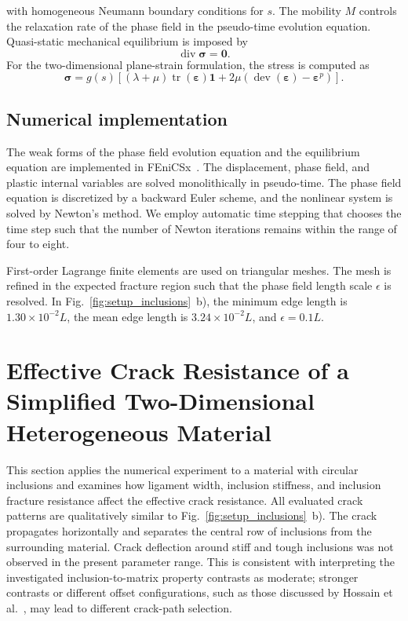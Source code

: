 \documentclass[pamm,a4paper,fleqn]{w-art}
\newcommand{\added}[2][]{#2}
\begin{document}
with homogeneous Neumann boundary conditions for \(s\). \added{The mobility
\(M\) controls the relaxation rate of the phase field in the
pseudo-time evolution equation.} Quasi-static mechanical equilibrium
is imposed by
\begin{equation}
  \operatorname{div}\boldsymbol{\sigma}=\boldsymbol{0}.
  \label{eq:equilibrium}
\end{equation}
For the two-dimensional plane-strain formulation, the stress is
computed as
\begin{equation}
  \boldsymbol{\sigma}=g(s)\left[
    (\lambda+\mu)
    \operatorname{tr}(\boldsymbol{\varepsilon})\boldsymbol{1}
    +2\mu\left(
    \operatorname{dev}(\boldsymbol{\varepsilon})
    -\boldsymbol{\varepsilon}^p
    \right)
    \right].
  \label{eq:sigma_plast}
\end{equation}
\subsection{Numerical
  implementation}\label{sec:numerical_implementation}

The weak forms of the phase field evolution equation and the
equilibrium equation are implemented in FEniCSx~\cite{_fenicsx_}. The
displacement, phase field, and plastic internal variables are solved
monolithically in pseudo-time. The phase field equation is
discretized by a backward Euler scheme, and the nonlinear system is
solved by Newton's method. We employ automatic time stepping that
chooses the time step such that the number of Newton iterations
remains within
the range of four to eight.

First-order Lagrange finite elements are used on triangular meshes.
The mesh is refined in the expected fracture region such that the
phase field length scale $\epsilon$ is resolved. In
Fig.~\ref{fig:setup_inclusions}~b), the minimum edge length is
\(1.30\times 10^{-2}L\), the mean edge length is \(3.24\times
10^{-2}L\), and \(\epsilon=0.1L\).

\section{Effective Crack Resistance of a Simplified Two-Dimensional
  Heterogeneous Material}\label{sec:2Dresults}

This section applies the numerical experiment to a material with
circular inclusions and examines how ligament width, inclusion
stiffness, and inclusion fracture resistance affect the effective
crack resistance.
All evaluated crack patterns are qualitatively similar to
Fig.~\ref{fig:setup_inclusions}~b). The crack propagates
horizontally and separates the central row of inclusions from the
surrounding material. \added{Crack deflection around stiff and tough
inclusions was not observed in the present parameter range. This is
consistent with interpreting the investigated inclusion-to-matrix
property contrasts as moderate; stronger contrasts or different
offset configurations, such as those discussed by Hossain et
al.}~\cite{hossain_effective_2014}, \added{may lead to different
crack-path selection.}
\end{document}
